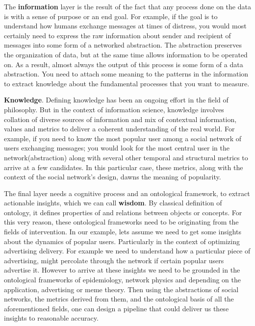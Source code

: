 The \textbf{information} layer is the result of the fact that any process done on the data is with a sense of purpose or an end goal. For example, if the goal is to understand how humans exchange messages at times of distress, you would most certainly need to express the raw information about sender and recipient of messages into some form of a networked abstraction. The abstraction preserves the organization of data, but at the same time allows information to be operated on. As a result, almost always the output of this process is some form of a data abstraction. You need to attach some meaning to the patterns in the information to extract knowledge about the fundamental processes that you want to measure.

\textbf{Knowledge}. Defining knowledge has been an ongoing effort in the field of philosophy. But in the context of information science, knowledge involves collation of diverse sources of information and  mix of contextual information, values and metrics to deliver a coherent understanding of the real world. For example, if you need to know the most popular user among a social network of users exchanging messages; you would look for the most central user in the network(abstraction) along with several other temporal and structural metrics to arrive at a few candidates. In this particular case, these metrics, along with the context of the social network's design, dawns the meaning of popularity. 

The final layer needs a cognitive process and an ontological framework, to extract actionable insights, which we can call \textbf{wisdom}. By classical definition of ontology, it defines properties of and relations between objects or concepts. For this very reason, these ontological frameworks need to be originating from the fields of intervention.  In our example, lets assume we need to get some insights about the dynamics of popular users. Particularly in the context of optimizing advertising delivery. For example we need to understand how a particular piece of advertising, might percolate through the network if certain popular users advertise it\cite{li2012diffusion}. However to arrive at these insights we need to be grounded in the ontological frameworks of epidemiology, network physics and depending on the application, advertising or meme theory. Then using the abstractions of social networks, the metrics derived from them, and the ontological basis of all the aforementioned fields, one can design a pipeline that could deliver us these insights to reasonable accuracy. 

